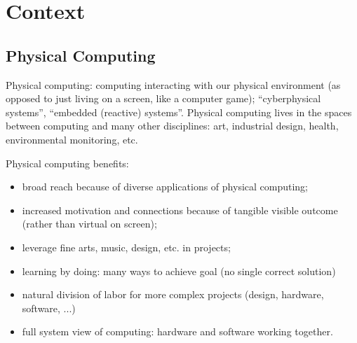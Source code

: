 \section{Context}
\label{sec:domain}

\subsection{Physical Computing}
Physical computing: computing interacting with our physical environment (as opposed to just
living on a screen, like a computer game); ``cyberphysical systems'', ``embedded (reactive) systems''.
Physical computing lives in the spaces between computing and many other disciplines:
art, industrial design, health, environmental monitoring, etc.


Physical computing benefits:
\begin{itemize}
\item broad reach because of diverse applications of physical computing;
\item increased motivation and connections because of tangible visible outcome (rather than virtual on screen);
\item leverage fine arts, music, design, etc. in projects;
\item learning by doing: many ways to achieve goal (no single correct solution)
\item natural division of labor for more complex projects (design, hardware, software, ...)
\item full system view of computing: hardware and software working together.
\end{itemize}


